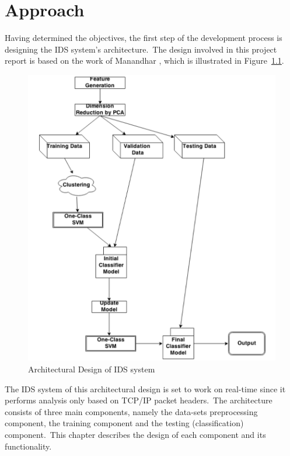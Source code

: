 \chapter{Approach}
\label{approach}

	Having determined the objectives, the first step of the development process is designing the IDS system's architecture.\ The design involved in this project report is based on the work of Manandhar \cite{Manandhar:TowardsPracticalAnomalyBasedIDS}, which is illustrated in Figure~\ref{fig:originalArchitectureDesign}.
	
	\begin{figure}[hb]
	  \centering
	  \includegraphics[scale=0.3268]{figures/OriginalArchitecture.png}
	  \caption{Architectural Design of IDS system \cite{Manandhar:TowardsPracticalAnomalyBasedIDS}}
	  \label{fig:originalArchitectureDesign}
	\end{figure}
	
	 The IDS system of this architectural design is set to work on real-time since it performs analysis only based on TCP/IP packet headers.\ The architecture consists of three main components, namely the data-sets preprocessing component, the training component and the testing (classification) component.\ This chapter describes the design of each component and its functionality.
	
